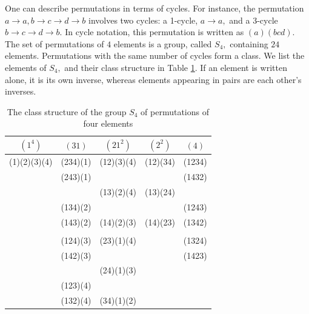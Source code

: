 \documentclass[pra,twocolumn,nofootinbib,showpacs]{revtex4}
\begin{document}
One can describe permutations in terms of cycles. For instance, the
permutation $a\rightarrow a,b\rightarrow c\rightarrow d\rightarrow b$
involves two cycles: a 1-cycle, $a\rightarrow a,$ and a 3-cycle $%
b\rightarrow c\rightarrow d\rightarrow b.$ In cycle notation, this
permutation is written as $(a)(bcd).$ The set of permutations of $4$
elements is a group, called $S_{4},$ containing $24$ elements. Permutations
with the same number of cycles form a class. We list the elements of $S_{4},$
and their class structure in Table \ref{S_4}. If an element is written
alone, it is its own inverse, whereas elements appearing in pairs are each
other's inverses.
\begin{table}[h]
\par
\begin{tabular}{ccccc}
$(1^{4})$ & $(31)$ & $(21^{2})$ & $(2^{2})$ & $(4)$ \\ \hline
(1)(2)(3)(4) & (234)(1) & (12)(3)(4) & (12)(34) & (1234) \\
& (243)(1) &  &  & (1432) \\
&  & (13)(2)(4) & (13)(24) &  \\
& (134)(2) &  &  & (1243) \\
& (143)(2) & (14)(2)(3) & (14)(23) & (1342) \\
&  &  &  &  \\
& (124)(3) & (23)(1)(4) &  & (1324) \\
& (142)(3) &  &  & (1423) \\
&  & (24)(1)(3) &  &  \\
& (123)(4) &  &  &  \\
& (132)(4) & (34)(1)(2) &  &
\end{tabular}%
\caption{The class structure of the group $S_{4}$ of permutations of four
elements}
\label{S_4}
\end{table}
\end{document}
